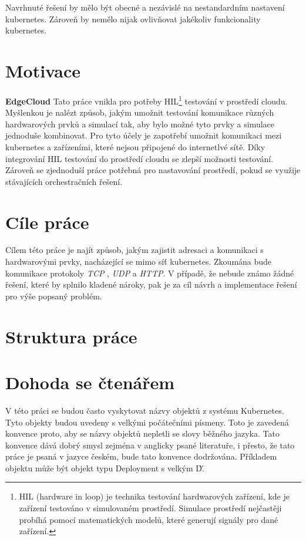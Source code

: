 Navrhnuté řešení by mělo být obecné a nezávislé na nestandardním nastavení kubernetes. Zároveň by nemělo nijak ovlivňovat jakékoliv funkcionality kubernetes. 

\newpage

\section{Motivace}
\textbf{EdgeCloud}
Tato práce vnikla pro potřeby HIL\footnote{HIL (hardware in loop) je technika testování hardwarových zařízení, kde je zařízení testováno v simulovaném prostředí. Simulace prostředí nejčastěji probíhá pomocí matematických modelů, které generují signály pro dané zařízení.\cite{a2022_what}} testování v prostředí cloudu. Myšlenkou je nalézt způsob, jakým umožnit testování komunikace různých hardwarových prvků a simulací tak, aby bylo možné tyto prvky a simulace jednoduše kombinovat. Pro tyto účely je zapotřebí umožnit komunikaci mezi kubernetes a zařízeními, které nejsou připojené do internetlvé sítě. Díky integrování HIL testování do prostředí cloudu se zlepší možnosti testování. Zároveň se zjednoduší práce potřebná pro nastavování prostředí, pokud se využije stávajících orchestračních řešení.

\section{Cíle práce}
Cílem této práce je najít způsob, jakým zajistit adresaci a komunikaci s hardwarovými prvky, nacházející se mimo síť kubernetes. Zkoumána bude komunikace protokoly \textit{TCP} , \textit{UDP} a \textit{HTTP}. V případě, že nebude známo žádné řešení, které by splnilo kladené nároky, pak je za cíl návrh a implementace řešení pro výše popsaný problém.

\section{Struktura práce}
\lipsum[1]
\section{Dohoda se čtenářem}
V této práci se budou často vyskytovat názvy objektů z systému Kubernetes. Tyto objekty budou uvedeny s velkými počátečními písmeny. Toto je zavedená konvence proto, aby se názvy objektů nepletli se slovy běžného jazyka. Tato konvence dává dobrý smysl zejména v anglicky psané literatuře, i přesto, že tato práce je psaná v jazyce českém, bude tato konvence dodržována. Příkladem objektu může být objekt typu Deployment s velkým \'D\'.

